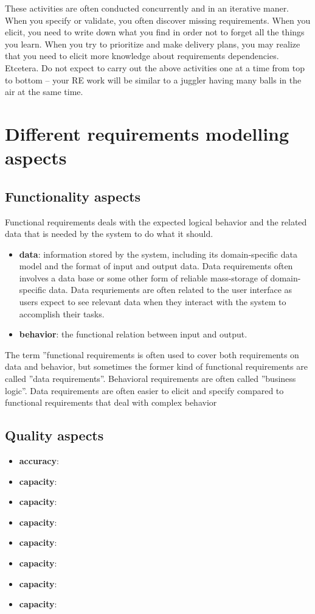 These activities are often conducted concurrently and in an iterative maner. When you specify or validate, you often discover missing requirements. When you elicit, you need to write down what you find in order not to forget all the things you learn. When you try to prioritize and make delivery plans, you may realize that you need to elicit more knowledge about requirements dependencies. Etcetera. Do not expect to carry out the above activities one at a time from top to bottom -- your RE work will be similar to a juggler having many balls in the air at the same time. 

\section*{Different requirements modelling aspects}

\subsection*{Functionality aspects}
Functional requirements deals with the expected logical behavior and the related data that is needed by the system to do what it should.
\begin{itemize}
  \item \textbf{data}: information stored by the system, including its domain-specific data model and the format of input and output data. Data requirements often involves a data base or some other form of reliable mass-storage of domain-specific data. Data requriements are often related to the user interface as users expect to see relevant data when they interact with the system to accomplish their tasks. 
  \item \textbf{behavior}: the functional relation between input and output.
\end{itemize}

The term ''functional requirements is often used to cover both requirements on data and behavior, but sometimes the former kind of functional requirements are called ''data requirements''. Behavioral requirements are often called ''business logic''. Data requirements are often easier to elicit and specify compared to functional requirements that deal with complex behavior 

\subsection*{Quality aspects}

\begin{itemize}
  \item \textbf{accuracy}:
  \item \textbf{capacity}:
  \item \textbf{capacity}:
  \item \textbf{capacity}:
  \item \textbf{capacity}:
  \item \textbf{capacity}:
  \item \textbf{capacity}:
  \item \textbf{capacity}:
\end{itemize}

